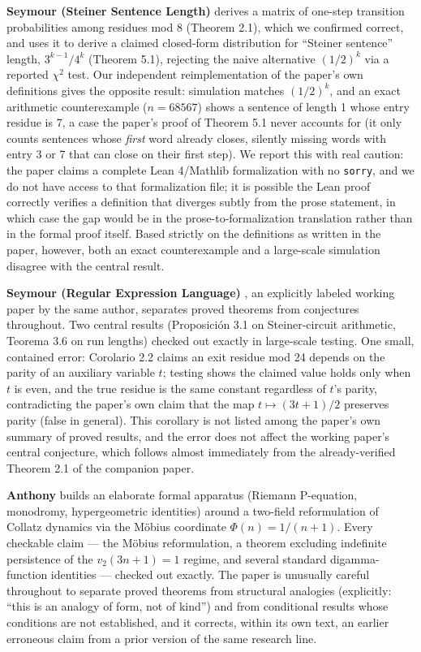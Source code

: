 \documentclass[11pt]{article}
\begin{document}
\textbf{Seymour (Steiner Sentence Length)} \cite{Seymour2026a} derives a
matrix of one-step transition probabilities among residues mod 8
(Theorem 2.1), which we confirmed correct, and uses it to derive a
claimed closed-form distribution for ``Steiner sentence'' length,
$3^{k-1}/4^k$ (Theorem 5.1), rejecting the naive alternative $(1/2)^k$
via a reported $\chi^2$ test. Our independent reimplementation of the
paper's own definitions gives the opposite result: simulation matches
$(1/2)^k$, and an exact arithmetic counterexample ($n=68567$) shows a
sentence of length 1 whose entry residue is 7, a case the paper's proof
of Theorem 5.1 never accounts for (it only counts sentences whose
\emph{first} word already closes, silently missing words with entry 3
or 7 that can close on their first step). We report this with real
caution: the paper claims a complete Lean 4/Mathlib formalization with
no \texttt{sorry}, and we do not have access to that formalization
file; it is possible the Lean proof correctly verifies a definition
that diverges subtly from the prose statement, in which case the gap
would be in the prose-to-formalization translation rather than in the
formal proof itself. Based strictly on the definitions as written in
the paper, however, both an exact counterexample and a large-scale
simulation disagree with the central result.

\textbf{Seymour (Regular Expression Language)} \cite{Seymour2026b}, an
explicitly labeled working paper by the same author, separates proved
theorems from conjectures throughout. Two central results (Proposición
3.1 on Steiner-circuit arithmetic, Teorema 3.6 on run lengths) checked
out exactly in large-scale testing. One small, contained error: Corolario
2.2 claims an exit residue mod 24 depends on the parity of an auxiliary
variable $t$; testing shows the claimed value holds only when $t$ is
even, and the true residue is the same constant regardless of $t$'s
parity, contradicting the paper's own claim that the map $t \mapsto
(3t+1)/2$ preserves parity (false in general). This corollary is not
listed among the paper's own summary of proved results, and the error
does not affect the working paper's central conjecture, which follows
almost immediately from the already-verified Theorem 2.1 of the
companion paper.

\textbf{Anthony} \cite{Anthony2026} builds an elaborate formal apparatus
(Riemann P-equation, monodromy, hypergeometric identities) around a
two-field reformulation of Collatz dynamics via the Möbius coordinate
$\Phi(n) = 1/(n+1)$. Every checkable claim --- the Möbius
reformulation, a theorem excluding indefinite persistence of the
$v_2(3n+1)=1$ regime, and several standard digamma-function identities
--- checked out exactly. The paper is unusually careful throughout to
separate proved theorems from structural analogies (explicitly: ``this
is an analogy of form, not of kind'') and from conditional results
whose conditions are not established, and it corrects, within its own
text, an earlier erroneous claim from a prior version of the same
research line.
\end{document}
